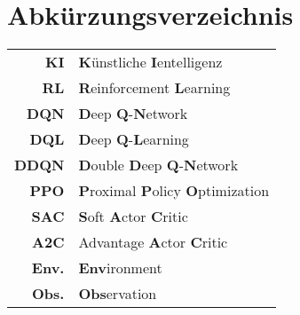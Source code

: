 \chapter{Abkürzungsverzeichnis}
\begin{center}
\begin{tabular}{rl}
\textbf{KI} & \textbf{K}ünstliche \textbf{I}entelligenz\\
\textbf{RL} & \textbf{R}einforcement \textbf{L}earning \\
\textbf{DQN} & \textbf{D}eep \textbf{Q}-\textbf{N}etwork\\
\textbf{DQL} & \textbf{D}eep \textbf{Q}-\textbf{L}earning\\
\textbf{DDQN} & \textbf{D}ouble \textbf{D}eep \textbf{Q}-\textbf{N}etwork\\
\textbf{PPO} & \textbf{P}roximal \textbf{P}olicy \textbf{O}ptimization\\
\textbf{SAC} & \textbf{S}oft \textbf{A}ctor \textbf{C}ritic\\
\textbf{A2C} & Advantage \textbf{A}ctor \textbf{C}ritic\\
\textbf{Env.} & \textbf{Env}ironment \\
\textbf{Obs.} & \textbf{Obs}ervation \\
\end{tabular}
\end{center}
 